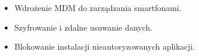 \begin{itemize}
    \item Wdrożenie MDM do zarządzania smartfonami.
    \item Szyfrowanie i zdalne usuwanie danych.
    \item Blokowanie instalacji nieautoryzowanych aplikacji.
\end{itemize}
    